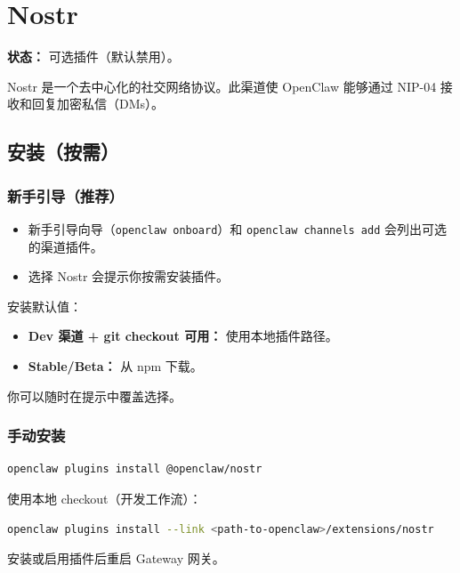 \clearpage

\section{Nostr}


\textbf{状态：} 可选插件（默认禁用）。

Nostr 是一个去中心化的社交网络协议。此渠道使 OpenClaw 能够通过 NIP-04 接收和回复加密私信（DMs）。

\subsection{安装（按需）}


\subsubsection{新手引导（推荐）}


\begin{itemize}
  \item 新手引导向导（\texttt{openclaw onboard}）和 \texttt{openclaw channels add} 会列出可选的渠道插件。
  \item 选择 Nostr 会提示你按需安装插件。
\end{itemize}


安装默认值：

\begin{itemize}
  \item \textbf{Dev 渠道 + git checkout 可用：} 使用本地插件路径。
  \item \textbf{Stable/Beta：} 从 npm 下载。
\end{itemize}


你可以随时在提示中覆盖选择。

\subsubsection{手动安装}


\begin{lstlisting}[language=bash]
openclaw plugins install @openclaw/nostr
\end{lstlisting}


使用本地 checkout（开发工作流）：

\begin{lstlisting}[language=bash]
openclaw plugins install --link <path-to-openclaw>/extensions/nostr
\end{lstlisting}


安装或启用插件后重启 Gateway 网关。

